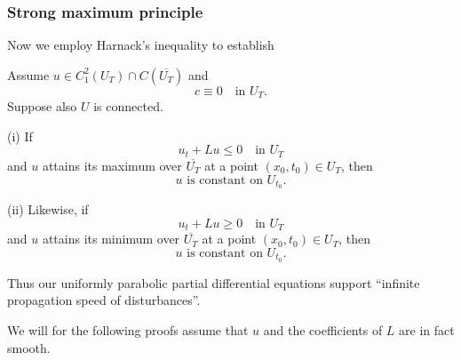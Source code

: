 \subsubsection{Strong maximum principle}

\begin{figure}[h]\centering
\end{figure}

Now we employ Harnack's inequality to establish

\begin{theorem}
\label{thm:parabolic-strong-maximum-principle}
Assume $u \in C_1^2(U_T) \cap C(\overline{U_T})$ and
\[
c \equiv 0 \quad \text{in } U_T.
\]
Suppose also $U$ is connected.

(i) If
\[
u_t + Lu \leq 0 \quad \text{in } U_T
\]
and $u$ attains its maximum over $\overline{U_T}$ at a point $(x_0, t_0) \in U_T$, then
\[
u \text{ is constant on } U_{t_0}.
\]

(ii) Likewise, if
\[
u_t + Lu \geq 0 \quad \text{in } U_T
\]
and $u$ attains its minimum over $\overline{U_T}$ at a point $(x_0, t_0) \in U_T$, then
\[
u \text{ is constant on } U_{t_0}.
\]
\end{theorem}

\begin{remark}
\label{rem:parabolic-infinite-propagation-speed}
Thus our uniformly parabolic partial differential equations support ``infinite propagation speed of disturbances''.
\end{remark}

We will for the following proofs assume that $u$ and the coefficients of $L$ are in fact smooth.

